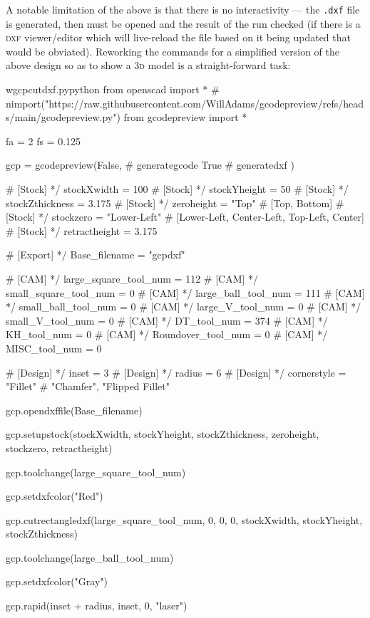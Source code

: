 \documentclass{ltxdoc}
\begin{document}
A notable limitation of the above is that there is no interactivity --- the \verb|.dxf| file is generated, then must be opened and the result of the run checked (if there is a \textsc{dxf} viewer/editor which will live-reload the file based on it being updated that would be obviated). Reworking the commands for a simplified version of the above design so as to show a \textsc{3d} model is a straight-forward task:

\lstset{firstnumber=1}%
\begin{writecode}{w}{gcpcutdxf.py}{python}
from openscad import *
# nimport("https://raw.githubusercontent.com/WillAdams/gcodepreview/refs/heads/main/gcodepreview.py")
from gcodepreview import *

fa = 2
fs = 0.125

gcp = gcodepreview(False, # generategcode
                   True   # generatedxf
                   )

# [Stock] */
stockXwidth = 100
# [Stock] */
stockYheight = 50
# [Stock] */
stockZthickness = 3.175
# [Stock] */
zeroheight = "Top"  # [Top, Bottom]
# [Stock] */
stockzero = "Lower-Left"  # [Lower-Left, Center-Left, Top-Left, Center]
# [Stock] */
retractheight = 3.175

# [Export] */
Base_filename = "gcpdxf"


# [CAM] */
large_square_tool_num = 112
# [CAM] */
small_square_tool_num = 0
# [CAM] */
large_ball_tool_num = 111
# [CAM] */
small_ball_tool_num = 0
# [CAM] */
large_V_tool_num = 0
# [CAM] */
small_V_tool_num = 0
# [CAM] */
DT_tool_num = 374
# [CAM] */
KH_tool_num = 0
# [CAM] */
Roundover_tool_num = 0
# [CAM] */
MISC_tool_num = 0

# [Design] */
inset = 3
# [Design] */
radius = 6
# [Design] */
cornerstyle = "Fillet"  # "Chamfer", "Flipped Fillet"

gcp.opendxffile(Base_filename)

gcp.setupstock(stockXwidth, stockYheight, stockZthickness, zeroheight, stockzero, retractheight)

gcp.toolchange(large_square_tool_num)

gcp.setdxfcolor("Red")

gcp.cutrectangledxf(large_square_tool_num, 0, 0, 0, stockXwidth, stockYheight, stockZthickness)

gcp.toolchange(large_ball_tool_num)

gcp.setdxfcolor("Gray")

gcp.rapid(inset + radius, inset, 0, "laser")


\end{writecode}
\end{document}
